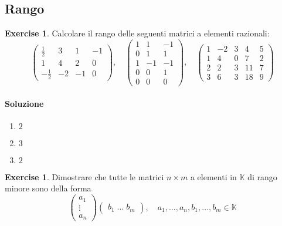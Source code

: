 \documentclass{article}
\theoremstyle{plain}
\theoremstyle{definition}
\newtheorem{xca}[exmp]{Exercise}
\theoremstyle{remark}
\begin{document}
\newpage
\subsection{Rango}
\vspace{20pt}

\begin{bxthm}
\begin{xca}
    Calcolare il rango delle seguenti matrici a elementi razionali:
    \[\begin{pmatrix}
        \frac{1}{2}&3&1&-1\\
        1&4&2&0\\
        -\frac{1}{2}&-2&-1&0
    \end{pmatrix},\quad\begin{pmatrix}
        1&1&-1\\
        0&1&1\\
        1&-1&-1\\
        0&0&1\\
        0&0&0
    \end{pmatrix},\quad\begin{pmatrix}
        1&-2&3&4&5\\
        1&4&0&7&2\\
        2&2&3&11&7\\
        3&6&3&18&9
    \end{pmatrix}\]
\end{xca}
\end{bxthm}
\paragraph{Soluzione}
\begin{enumerate}
    \item $2$
    \item $3$
    \item $2$
\end{enumerate}

\vspace{10pt}

\begin{bxthm}
\begin{xca}
    Dimostrare che tutte le matrici $n\times m$ a elementi in $\mathbb{K}$ di rango minore sono della forma
    \[\begin{pmatrix}
        a_1\\
        \vdots\\
        a_n
    \end{pmatrix}\begin{pmatrix}
        b_1\;\ldots\;b_m
    \end{pmatrix},\quad a_1,\ldots,a_n,b_1,\ldots,b_m\in\mathbb{K}\]
\end{xca}
\end{bxthm}
\end{document}
